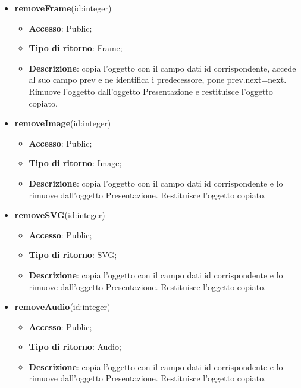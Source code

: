 {{\begin{itemize}
			\begin{itemize}
				\item \textbf{Accesso}: Public;
				\item \textbf{Tipo di ritorno}: Text;
				\item \textbf{Descrizione}: copia l’oggetto con il campo dati id corrispondente e lo rimuove dall’oggetto Presentazione. Restituisce l’oggetto copiato.
			\end{itemize}
			\item \textbf{removeFrame}(id:integer)
			\begin{itemize}
				\item \textbf{Accesso}: Public;
				\item \textbf{Tipo di ritorno}: Frame;
				\item \textbf{Descrizione}: copia l’oggetto con il campo dati id corrispondente, accede al suo campo prev e ne identifica i predecessore, pone prev.next=next. Rimuove l’oggetto dall’oggetto Presentazione e restituisce l’oggetto copiato.
			\end{itemize}
			\item \textbf{removeImage}(id:integer)
			\begin{itemize}
				\item \textbf{Accesso}: Public;
				\item \textbf{Tipo di ritorno}: Image;
				\item \textbf{Descrizione}: copia l’oggetto con il campo dati id corrispondente e lo rimuove dall’oggetto Presentazione. Restituisce l’oggetto copiato.
			\end{itemize}
			\item \textbf{removeSVG}(id:integer)
			\begin{itemize}
				\item \textbf{Accesso}: Public;
				\item \textbf{Tipo di ritorno}: SVG;
				\item \textbf{Descrizione}: copia l’oggetto con il campo dati id corrispondente e lo rimuove dall’oggetto Presentazione. Restituisce l’oggetto copiato.
			\end{itemize}
			\item \textbf{removeAudio}(id:integer)
			\begin{itemize}
				\item \textbf{Accesso}: Public;
				\item \textbf{Tipo di ritorno}: Audio;
				\item \textbf{Descrizione}: copia l’oggetto con il campo dati id corrispondente e lo rimuove dall’oggetto Presentazione. Restituisce l’oggetto copiato.

\end{itemize}
\end{itemize}}}
